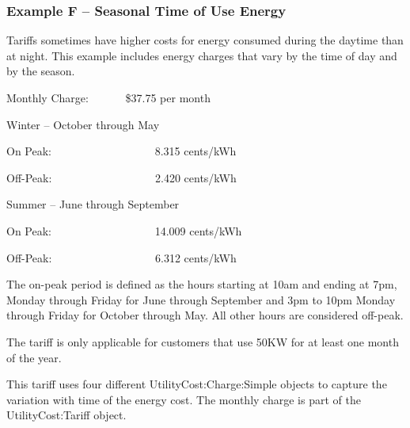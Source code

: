 \subsubsection{Example F -- Seasonal Time of Use Energy}\label{example-f-seasonal-time-of-use-energy}

Tariffs sometimes have higher costs for energy consumed during the daytime than at night. This example includes energy charges that vary by the time of day and by the season.

Monthly Charge:~~~~~~ \$37.75 per month

Winter -- October through May

On Peak:~~~~~~~~~~~~~~~~~~ 8.315 cents/kWh

Off-Peak:~~~~~~~~~~~~~~~~~~ 2.420 cents/kWh

Summer -- June through September

On Peak:~~~~~~~~~~~~~~~~~~ 14.009 cents/kWh

Off-Peak:~~~~~~~~~~~~~~~~~~ 6.312 cents/kWh

The on-peak period is defined as the hours starting at 10am and ending at 7pm, Monday through Friday for June through September and 3pm to 10pm Monday through Friday for October through May. All other hours are considered off-peak.

The tariff is only applicable for customers that use 50KW for at least one month of the year.

This tariff uses four different UtilityCost:Charge:Simple objects to capture the variation with time of the energy cost. The monthly charge is part of the UtilityCost:Tariff object.

